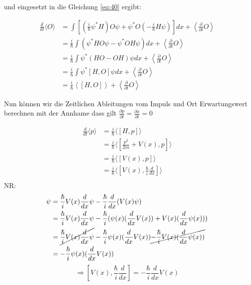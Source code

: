 und eingesetzt in die Gleichung \eqref{eq:40} ergibt:

\begin{align}
\frac{d}{dt}\langle  O\rangle  &=  \int \left[\left(\frac{i}{\hbar} \psi^* H\right) O\psi  + \psi^* O\left(-\frac{i}{\hbar} H\psi\right)\right]dx +  \left\langle  \frac{\partial}{\partial t} O\right\rangle\\
&=  \frac{i}{\hbar} \int ( \psi^* H O\psi  - \psi^* O H\psi)dx +  \left\langle  \frac{\partial}{\partial t} O\right\rangle\\
&=  \frac{i}{\hbar} \int \psi^* (  H O  -  O H )\psi dx +  \left\langle  \frac{\partial}{\partial t} O\right\rangle\\
&=  \frac{i}{\hbar} \int \psi^* [H, O]\psi dx +  \left\langle  \frac{\partial}{\partial t} O\right\rangle\\
&=  \frac{i}{\hbar} \left\langle [H, O]\right\rangle +  \left\langle  \frac{\partial}{\partial t} O\right\rangle
\end{align}






Nun können wir die Zeitlichen Ableitungen vom Impuls und Ort Erwartungswert berechnen mit der Annhame dass gilt \(\frac{\partial p}{\partial t} = \frac{\partial x}{\partial t} =  0 \)


\begin{align}
 \frac{d}{dt} \langle p \rangle  &= \frac{i}{\hbar} \langle [H,p]\rangle \\
&= \frac{i}{\hbar} \langle [\frac{p^2}{2m}+V(x),p]\rangle   \\
&= \frac{i}{\hbar} \langle [V(x),p]\rangle   \\
&= \frac{i}{\hbar} \langle [V(x),\frac{\hbar}{i}\frac{d}{dx} ]\rangle   \\
\end{align}
NR:
 \begin{align}
[V(x),\frac{\hbar}{i}\frac{d}{dx} ]\psi &=\frac{\hbar}{i} V(x)\frac{d}{dx} \psi - \frac{\hbar}{i}\frac{d}{dx}  (V(x)\psi)\\
&= \frac{\hbar}{i} V(x)\frac{d}{dx} \psi -\frac{\hbar}{i}(\psi(x) (\frac{d}{dx}  V(x)) + V(x) (\frac{d}{dx} \psi(x))  )  \\
&= \cancel{\frac{\hbar}{i} V(x)\frac{d}{dx} \psi} -\frac{\hbar}{i}\psi(x) (\frac{d}{dx}  V(x))\cancel{ -\frac{\hbar}{i} V(x) (\frac{d}{dx} \psi(x))}   \\
&=-\frac{\hbar}{i}\psi(x) (\frac{d}{dx}  V(x))
\end{align}
\[\Rightarrow [V(x),\frac{\hbar}{i}\frac{d}{dx} ] = -\frac{\hbar}{i} \frac{d}{dx}  V(x) \]


